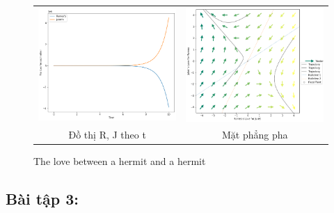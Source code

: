 \documentclass[a4paper]{article}
\begin{document}
\begin{enumerate}
\begin{itemize}
\begin{figure}[htp]
\begin{tabular}{cc}
            \includegraphics[scale = .33]{Images/Bt2/10.2_gr.png} &
            \includegraphics[scale = .33]{Images/Bt2/10.2_phase.png} \\
            Đồ thị R, J theo t & Mặt phẳng pha
        \end{tabular}
        \caption{The love between a hermit and a hermit}
    \end{figure}
    \end{itemize}
\end{enumerate}
\newpage
\subsection{Bài tập 3:} \label{ex:3}
\end{document}

